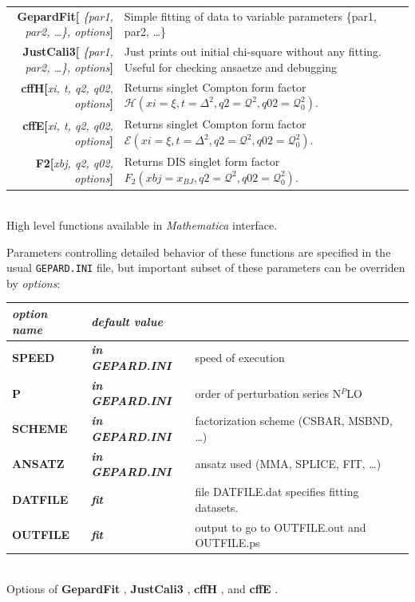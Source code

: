 \documentclass[12pt]{article}
\newcommand{\defboxitem}[3]{ {\ttfamily \bfseries #1[}\emph{#2}{\ttfamily \bfseries ]} & #3 }
\newcommand{\optboxitem}[3]{ {\ttfamily \bfseries #1} & {\ttfamily \bfseries #2 } & #3 }
\newcommand{\mmacomm}[1]{ {\ttfamily \bfseries #1} }
\begin{document}
\begin{flushleft}
\colorbox{defbox}{%
\begin{minipage}{\textwidth}%
\begin{tabular}{rp{8cm}}%
\defboxitem{GepardFit}{ \{par1, par2, \ldots\}, options}{Simple fitting of data to 
variable parameters \{par1, par2, \ldots\}} \\[0.8ex]
\defboxitem{JustCali3}{ \{par1, par2, \ldots\}, options}{Just prints out initial chi-square without
any fitting. Useful for checking ansaetze and debugging}\\[0.8ex]
\defboxitem{cffH}{xi, t, q2, q02, options}{Returns singlet Compton form factor
$\mathcal{H}(xi=\xi, t=\Delta^2, q2=\mathcal{Q}^2, q02=\mathcal{Q}_{0}^2)$.}\\[0.8ex]
\defboxitem{cffE}{xi, t, q2, q02, options}{Returns singlet Compton form factor
$\mathcal{E}(xi=\xi, t=\Delta^2, q2=\mathcal{Q}^2, q02=\mathcal{Q}_{0}^2)$.}\\[0.8ex] 
\defboxitem{F2}{xbj, q2, q02, options}{Returns DIS singlet form factor
$F_{2}(xbj=x_{BJ}, q2=\mathcal{Q}^2, q02=\mathcal{Q}_{0}^2)$.} 
\end{tabular}%
\end{minipage}}\\[0.5ex]
{\small High level functions available in \emph{Mathematica} interface.}
\end{flushleft}

Parameters controlling detailed behavior of these functions are specified in
the usual \texttt{GEPARD.INI} file, but important subset of these parameters can
be overriden by \emph{options}:

\begin{flushleft}
\colorbox{defbox}{%
\begin{minipage}{\textwidth}%
\begin{tabular}{llp{8cm}}%
\emph{option name} & \emph{default value} & \\ \hline
\optboxitem{SPEED}{\emph{in GEPARD.INI}}{speed of execution} \\
\optboxitem{P}{\emph{in GEPARD.INI}}{order of perturbation series N$^{P}$LO}\\
\optboxitem{SCHEME}{\emph{in GEPARD.INI}}{factorization scheme (CSBAR, MSBND, \ldots)}\\
\optboxitem{ANSATZ}{\emph{in GEPARD.INI}}{ansatz used (MMA, SPLICE, FIT, \ldots)}\\
\optboxitem{DATFILE}{\emph{fit}}{file DATFILE.dat specifies fitting datasets.}\\
\optboxitem{OUTFILE}{\emph{fit}}{output to go to OUTFILE.out and OUTFILE.ps}
\end{tabular}%
\end{minipage}}\\[0.5ex]
{\small Options of \mmacomm{GepardFit}, \mmacomm{JustCali3}, \mmacomm{cffH}, 
and \mmacomm{cffE}.}
\end{flushleft}
\end{document}
